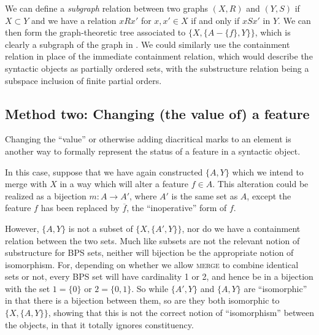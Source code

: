 \documentclass[output=paper]{langsci/langscibook}
\begin{document}
We can define a \emph{subgraph} relation between two graphs $(X,R)$ and $(Y,S)$
if $X\subset Y$ and we have a relation $xRx'$ for $x,x'\in X$ if
and only if $xSx'$ in $Y$. We can then form the graph-theoretic tree
associated to $\{X,\{A-\{f\},Y\}\}$, which is clearly a subgraph of the graph
in . We could similarly use the containment relation in
place of the immediate containment relation, which would describe the syntactic
objects as partially ordered sets, with the substructure relation being a
subspace inclusion of finite partial orders.

\subsection{Method two: Changing (the value of) a feature}

Changing the \enquote{value} or otherwise adding diacritical marks to an element is
another way to formally represent the status of a feature in a syntactic
object.

In this case, suppose that we have again constructed $\{A,Y\}$ which we intend
to merge with $X$ in a way which will alter a feature $f\in A$. This
alteration could be realized as a bijection $m:A\rightarrow A'$, where $A'$ is
the same set as $A$, except the feature $f$ has been replaced by
$\overline{f}$, the ``inoperative'' form of $f$.

However, $\{A,Y\}$ is not a subset of $\{X,\{A',Y\}\}$, nor do we have a
containment relation between the two sets. Much like subsets are not the
relevant notion of substructure for \gls{BPS} sets, neither will bijection be
the appropriate notion of isomorphism. For, depending on whether we allow
\textsc{merge} to combine identical sets or not, every \gls{BPS} set will have
cardinality 1 or 2, and hence be in a bijection with the set $1=\{0\}$ or
$2=\{0,1\}$. So while $\{A',Y\}$ and $\{A,Y\}$ are \enquote{isomorphic} in that there
is a bijection between them, so are they both isomorphic to $\{X,\{A,Y\}\}$,
showing that this is not the correct notion of \enquote{isomorphism} between the
objects, in that it totally ignores constituency.
\end{document}
